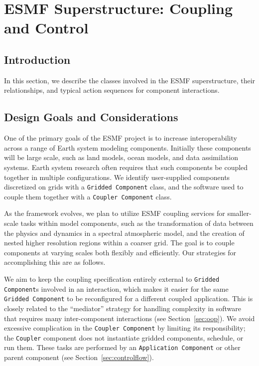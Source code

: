 \section{ESMF Superstructure:  Coupling and Control}
\label{sec:superclasses}

\subsection{Introduction}

In this section, we describe the classes involved in the ESMF superstructure, 
their relationships, and typical action sequences for component interactions.

\subsection{Design Goals and Considerations}

One of the primary goals of the ESMF project is to increase interoperability
across a range of Earth system modeling components.  Initially these 
components will be large scale, such as land models, ocean models, 
and data assimilation systems.  Earth system research 
often requires that such components be coupled together in multiple
configurations.  We identify user-supplied components discretized on grids with 
a {\tt Gridded Component} class, and the software used to couple them together
with a {\tt Coupler Component} class.  

As the framework evolves, we plan to utilize ESMF coupling services for 
smaller-scale tasks within model components, such as the transformation of 
data between the 
physics and dynamics in a spectral atmospheric model, and the creation 
of nested higher resolution regions within a coarser grid.  The goal is 
to couple components at varying scales both flexibly and efficiently.  
Our strategies for accomplishing this are as follows.

We aim to keep the coupling specification entirely external 
to {\tt Gridded Component}s involved in an interaction, which makes it easier 
for the same {\tt Gridded Component} to be reconfigured for a different 
coupled application.
This is closely related to the ``mediator'' strategy for handling complexity in 
software that requires many inter-component interactions (see Section~\ref{sec:oop}).  
We avoid excessive complication in the {\tt Coupler Component} by limiting
its responsibility; the {\tt Coupler} component does not instantiate 
gridded components, schedule, or run them.  These tasks are performed
by an {\tt Application Component} or other parent component (see 
Section~\ref{sec:controlflow}).

